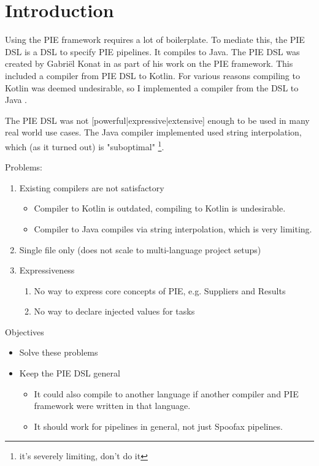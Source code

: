 
\chapter{\label{chap:introduction}Introduction}


Using the PIE framework requires a lot of boilerplate.
To mediate this, the PIE DSL is a DSL to specify PIE pipelines.
It compiles to Java.
The PIE DSL was created by Gabriël Konat in  as part of his work on the PIE framework.
This included a compiler from PIE DSL to Kotlin.
For various reasons compiling to Kotlin was deemed undesirable, so I implemented a compiler from the DSL to Java .

The PIE DSL was not [powerful|expressive|extensive] enough to be used in many real world use cases.
The Java compiler implemented used string interpolation, which (as it turned out) is "suboptimal" \footnote{it's severely limiting, don't do it}.

Problems:
\begin{enumerate}
  \item Existing compilers are not satisfactory
  \begin{itemize}
     \item Compiler to Kotlin is outdated, compiling to Kotlin is undesirable.
     \item Compiler to Java compiles via string interpolation, which is very limiting.
   \end{itemize}
  \item Single file only (does not scale to multi-language project setups)
  \item Expressiveness
  \begin{enumerate}
    \item No way to express core concepts of PIE, e.g. Suppliers and Results
    \item No way to declare injected values for tasks
  \end{enumerate}
\end{enumerate}

Objectives
\begin{itemize}
  \item Solve these problems
  \item Keep the PIE DSL general
  \begin{itemize}
    \item It could also compile to another language if another compiler and PIE framework were written in that language.
    \item It should work for pipelines in general, not just Spoofax pipelines.
  \end{itemize}
\end{itemize}

